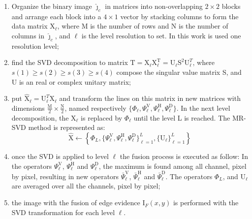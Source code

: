 \documentclass[journal]{IEEEtran}
\begin{document}
\begin{enumerate}
\item Organize the binary image $\bm{\widehat\jmath}_c$ in matrices into non-overlapping $2\times 2$ blocks and arrange each block into a $4\times 1$ vector by stacking columns to form the data matrix $\text{X}_\ell$, where M is the number of rows and N is the number of columns in $\bm{\widehat\jmath}_c$, and $\ell$ is the level resolution to set. In this work is used one resolution level;
\item find the SVD decomposition to matrix $\text{T}=\text{X}_\ell \text{X}_\ell^\text{T}=\text{U}_\ell \text{S}^2 \text{U}_\ell^T$, where $s(1)\geq s(2) \geq s(3) \geq s(4)$ compose the singular value matrix S, and U is an real or complex unitary matrix;
\item put $\widehat{\text{X}}_\ell=\text{U}_\ell^T\text{X}_\ell$ and transform the lines on this matrix in new matrices with dimensions $\frac{\text{M}}{2}\times\frac{\text{N}}{2}$, named respectively $\{\Phi_\ell, \Psi_\ell^\text{V}, \Psi_\ell^\text{H}, \Psi_\ell^\text{D}\}$. In the next level decomposition, the $\text{X}_\ell$ is replaced by $\Phi_\ell$ until the level L is reached. The MR-SVD method is represented as:
\begin{equation}\label{msvd_iter}
\widehat{\text{X}}\leftarrow \left\{\Phi_L,\{\Psi_\ell^\text{V},\Psi_\ell^\text{H},\Psi_\ell^\text{D} \}_{\ell=1}^L,\{\text{U}_\ell\}_{\ell=1}^L \right\}
\end{equation}
\item once the SVD is applied to level $\ell$ the fusion process is executed as follow: In the operators $\Psi_\ell^\text{V}$, $\Psi_\ell^\text{H}$ and $\Psi_\ell^\text{D}$, the maximum is found among all channel, pixel by pixel, resulting in new operators $\bar{\Psi}_\ell^\text{V}$, $\bar{\Psi}_\ell^\text{H}$ and $\bar{\Psi}_\ell^\text{D}$. The operators $\Phi_L$, and $\text{U}_\ell$ are averaged over all the channels, pixel by pixel;
\item the image with the fusion of edge evidence $\text{I}_F(x,y)$ is performed with the SVD transformation for each level $\ell$. 
\end{enumerate}
\end{document}
